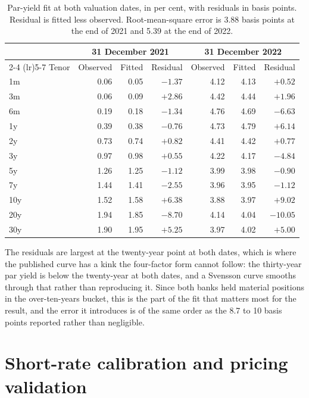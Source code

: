 \begin{table}[htbp]
\centering
\caption{Par-yield fit at both valuation dates, in per cent, with residuals in basis
points. Residual is fitted less observed. Root-mean-square error is 3.88 basis
points at the end of 2021 and 5.39 at the end of 2022.}
\label{tab:residuals}
\small
\begin{tabular}{lrrrrrr}
\toprule
 & \multicolumn{3}{c}{31 December 2021} & \multicolumn{3}{c}{31 December 2022} \\
\cmidrule(lr){2-4} \cmidrule(lr){5-7}
Tenor & Observed & Fitted & Residual & Observed & Fitted & Residual \\
\midrule
1m & 0.06 & 0.05 & $-1.37$ & 4.12 & 4.13 & $+0.52$ \\
3m & 0.06 & 0.09 & $+2.86$ & 4.42 & 4.44 & $+1.96$ \\
6m & 0.19 & 0.18 & $-1.34$ & 4.76 & 4.69 & $-6.63$ \\
1y & 0.39 & 0.38 & $-0.76$ & 4.73 & 4.79 & $+6.14$ \\
2y & 0.73 & 0.74 & $+0.82$ & 4.41 & 4.42 & $+0.77$ \\
3y & 0.97 & 0.98 & $+0.55$ & 4.22 & 4.17 & $-4.84$ \\
5y & 1.26 & 1.25 & $-1.12$ & 3.99 & 3.98 & $-0.90$ \\
7y & 1.44 & 1.41 & $-2.55$ & 3.96 & 3.95 & $-1.12$ \\
10y & 1.52 & 1.58 & $+6.38$ & 3.88 & 3.97 & $+9.02$ \\
20y & 1.94 & 1.85 & $-8.70$ & 4.14 & 4.04 & $-10.05$ \\
30y & 1.90 & 1.95 & $+5.25$ & 3.97 & 4.02 & $+5.00$ \\
\bottomrule
\end{tabular}
\end{table}

The residuals are largest at the twenty-year point at both dates, which is where the
published curve has a kink the four-factor form cannot follow: the thirty-year par
yield is below the twenty-year at both dates, and a Svensson curve smooths through
that rather than reproducing it. Since both banks held material positions in the
over-ten-years bucket, this is the part of the fit that matters most for the result,
and the error it introduces is of the same order as the 8.7 to 10 basis points
reported rather than negligible.

\section{Short-rate calibration and pricing validation}
\label{app:pricing}

